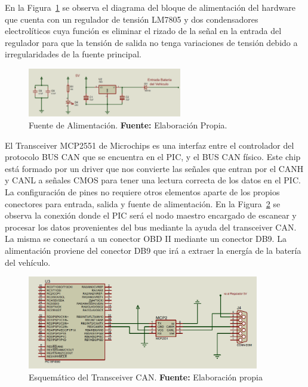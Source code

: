 En la Figura~\ref{Esch1} se observa el diagrama del bloque de alimentación del hardware que cuenta con un regulador de tensión LM7805 y dos condensadores electrolíticos cuya función es eliminar el rizado de la señal en la entrada del regulador para que la tensión de salida no tenga variaciones de tensión debido a irregularidades de la fuente principal. 

\begin{figure}[H]
	\centering
		\includegraphics[width=0.6\textwidth]{./Cap4imagen/Fuente5v_4.png}
	\caption[Fuente de Alimentación.]{Fuente de Alimentación.\textbf{ Fuente:} 
	Elaboración Propia.}
	\label{Esch1} %
\end{figure}




El Transceiver MCP2551 de Microchips es una interfaz entre el controlador del protocolo BUS CAN que se encuentra en el PIC, y el BUS CAN físico. 
Este chip está formado por un driver que nos convierte las señales que entran por el CANH  y CANL a señales CMOS para tener una lectura correcta de los datos en el PIC. 
La configuración de pines no requiere otros elementos aparte de los propios conectores para  entrada, salida y fuente de alimentación. 
En la Figura~\ref{Esch2} se observa la conexión donde el PIC será el nodo maestro encargado de escanear y procesar los datos provenientes del bus mediante la ayuda del transceiver CAN. 
La misma se conectará a un conector OBD II mediante un conector DB9. 
La alimentación proviene del conector DB9 que irá a extraer la energía de la batería del vehículo.


\begin{figure}[H]
	\centering
		\includegraphics[width=0.9\textwidth]{./Cap4imagen/pic_y_mcp_4.png}
	\caption[Esquemático del Transceiver CAN.]{Esquemático del Transceiver CAN.\textbf{ Fuente:} 
		Elaboración propia}
	\label{Esch2} %
\end{figure}

